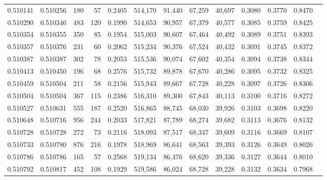 \begin{tabular}{rrrrrrrrrrrrr}
0.510141 & 0.510256 &   180 &    57 &                                     0.2405 & 514,170 &  91,440 &  67,259 &  40,697 & 0.3080 & 0.3770 & 0.8470 \\
0.510290 & 0.510346 &   483 &   120 &                                     0.1990 & 514,653 &  90,957 &  67,379 &  40,577 & 0.3085 & 0.3759 & 0.8425 \\
0.510354 & 0.510355 &   350 &    85 &                                     0.1954 & 515,003 &  90,607 &  67,464 &  40,492 & 0.3089 & 0.3751 & 0.8393 \\
0.510357 & 0.510376 &   231 &    60 &                                     0.2062 & 515,234 &  90,376 &  67,524 &  40,432 & 0.3091 & 0.3745 & 0.8372 \\
0.510387 & 0.510387 &   302 &    78 &                                     0.2053 & 515,536 &  90,074 &  67,602 &  40,354 & 0.3094 & 0.3738 & 0.8344 \\
0.510413 & 0.510450 &   196 &    68 &                                     0.2576 & 515,732 &  89,878 &  67,670 &  40,286 & 0.3095 & 0.3732 & 0.8325 \\
0.510459 & 0.510504 &   211 &    58 &                                     0.2156 & 515,943 &  89,667 &  67,728 &  40,228 & 0.3097 & 0.3726 & 0.8306 \\
0.510504 & 0.510504 &   367 &   115 &                                     0.2386 & 516,310 &  89,300 &  67,843 &  40,113 & 0.3100 & 0.3716 & 0.8272 \\
0.510527 & 0.510631 &   555 &   187 &                                     0.2520 & 516,865 &  88,745 &  68,030 &  39,926 & 0.3103 & 0.3698 & 0.8220 \\
0.510648 & 0.510716 &   956 &   244 &                                     0.2033 & 517,821 &  87,789 &  68,274 &  39,682 & 0.3113 & 0.3676 & 0.8132 \\
0.510728 & 0.510728 &   272 &    73 &                                     0.2116 & 518,093 &  87,517 &  68,347 &  39,609 & 0.3116 & 0.3669 & 0.8107 \\
0.510733 & 0.510780 &   876 &   216 &                                     0.1978 & 518,969 &  86,641 &  68,563 &  39,393 & 0.3126 & 0.3649 & 0.8026 \\
0.510786 & 0.510786 &   165 &    57 &                                     0.2568 & 519,134 &  86,476 &  68,620 &  39,336 & 0.3127 & 0.3644 & 0.8010 \\
0.510792 & 0.510817 &   452 &   108 &                                     0.1929 & 519,586 &  86,024 &  68,728 &  39,228 & 0.3132 & 0.3634 & 0.7968 \\

\end{tabular}
